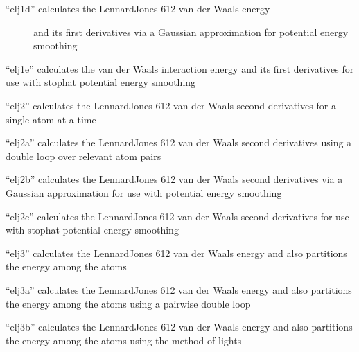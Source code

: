 \documentclass[letterpaper,11pt,english]{sphinxmanual}
\begin{document}
\begin{description}
\item[{“elj1d” calculates the Lennard\sphinxhyphen{}Jones 6\sphinxhyphen{}12 van der Waals energy}] \leavevmode
and its first derivatives via a Gaussian approximation for
potential energy smoothing

\end{description}


“elj1e” calculates the van der Waals interaction energy and its
first derivatives for use with stophat potential energy smoothing


“elj2” calculates the Lennard\sphinxhyphen{}Jones 6\sphinxhyphen{}12 van der Waals second
derivatives for a single atom at a time


“elj2a” calculates the Lennard\sphinxhyphen{}Jones 6\sphinxhyphen{}12 van der Waals second
derivatives using a double loop over relevant atom pairs


“elj2b” calculates the Lennard\sphinxhyphen{}Jones 6\sphinxhyphen{}12 van der Waals second
derivatives via a Gaussian approximation for use with potential
energy smoothing


“elj2c” calculates the Lennard\sphinxhyphen{}Jones 6\sphinxhyphen{}12 van der Waals second
derivatives for use with stophat potential energy smoothing


“elj3” calculates the Lennard\sphinxhyphen{}Jones 6\sphinxhyphen{}12 van der Waals energy
and also partitions the energy among the atoms


“elj3a” calculates the Lennard\sphinxhyphen{}Jones 6\sphinxhyphen{}12 van der Waals
energy and also partitions the energy among the atoms using
a pairwise double loop


“elj3b” calculates the Lennard\sphinxhyphen{}Jones 6\sphinxhyphen{}12 van der Waals
energy and also partitions the energy among the atoms using
the method of lights
\end{document}
